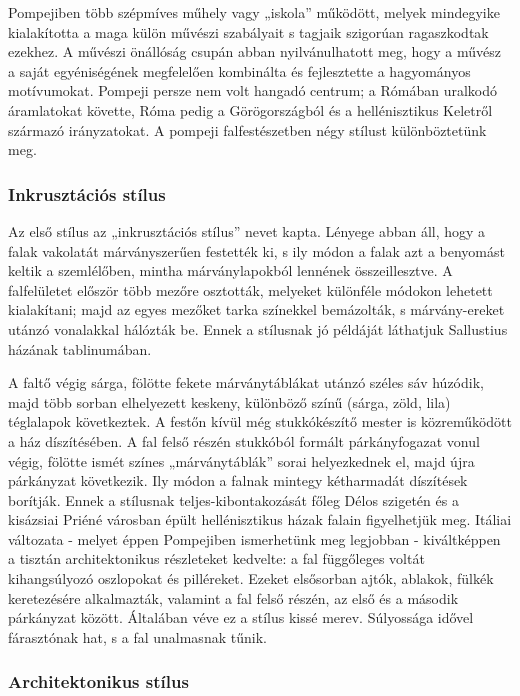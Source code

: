Pompejiben több szépmíves műhely vagy „iskola” működött, melyek mindegyike
kialakította a maga külön művészi szabályait s tagjaik szigorúan ragaszkodtak ezekhez. A
művészi önállóság csupán abban nyilvánulhatott meg, hogy a művész a saját
egyéniségének megfelelően kombinálta és fejlesztette a hagyományos motívumokat. 
Pompeji persze nem volt hangadó centrum; a Rómában uralkodó áramlatokat követte,
Róma pedig a Görögországból és a hellénisztikus Keletről származó irányzatokat. A
pompeji falfestészetben négy stílust különböztetünk meg.

\subsubsection{Inkrusztációs stílus}

Az első stílus az „inkrusztációs stílus” nevet kapta. Lényege abban áll, hogy a falak
vakolatát márványszerűen festették ki, s ily módon a falak azt a benyomást keltik a
szemlélőben, mintha márványlapokból lennének összeillesztve. A falfelületet először
több mezőre osztották, melyeket különféle módokon lehetett kialakítani; majd az egyes
mezőket tarka színekkel bemázolták, s márvány-ereket utánzó vonalakkal hálózták be.
Ennek a stílusnak jó példáját láthatjuk Sallustius házának tablinumában.


A faltő végig sárga, fölötte fekete márványtáblákat utánzó széles sáv húzódik, majd több
sorban elhelyezett keskeny, különböző színű (sárga, zöld, lila) téglalapok következtek. A
festőn kívül még stukkókészítő mester is közreműködött a ház díszítésében. A fal felső
részén stukkóból formált párkányfogazat vonul végig, fölötte ismét színes „márványtáblák” sorai helyezkednek el, majd újra párkányzat következik. Ily módon a
falnak mintegy kétharmadát díszítések borítják.
Ennek a stílusnak teljes-kibontakozását főleg Délos szigetén és a kisázsiai Priéné
városban épült hellénisztikus házak falain figyelhetjük meg. Itáliai változata - melyet
éppen Pompejiben ismerhetünk meg legjobban - kiváltképpen a tisztán architektonikus
részleteket kedvelte: a fal függőleges voltát kihangsúlyozó oszlopokat és pilléreket.
Ezeket elsősorban ajtók, ablakok, fülkék keretezésére alkalmazták, valamint a fal felső
részén, az első és a második párkányzat között. Általában véve ez a stílus kissé merev.
Súlyossága idővel fárasztónak hat, s a fal unalmasnak tűnik.

\subsubsection{Architektonikus stílus}


